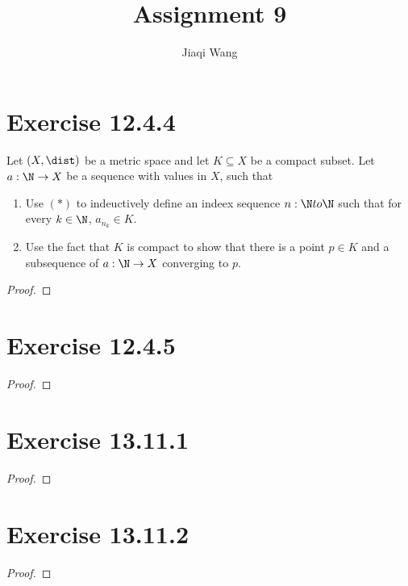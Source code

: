 \documentclass{assignment}
\title{Assignment 9}
\author{Jiaqi Wang}
\begin{document}
\maketitle

\section{Exercise 12.4.4}
\begin{problem}
    Let $(X, \dist)$ be a metric space and let $K \subseteq X$ be a compact subset. Let $a: \N \to X$ be a sequence with values in $X$, such that
    \begin{myCenter}[label=(*)]
    \end{myCenter}
    \begin{enumerate}
        \item Use $(*)$ to indeuctively define an indeex sequence $n: \N to \N$ such that for every $k \in \N$, $a_{n_k} \in K$.
        \item Use the fact that $K$ is compact to show that there is a point $p \in K$ and a subsequence of $a: \N \to X$ converging to $p$.
    \end{enumerate}
\end{problem}
\begin{proof}
\end{proof}

\section{Exercise 12.4.5}
\begin{problem}
\end{problem}
\begin{proof}
\end{proof}

\section{Exercise 13.11.1}
\begin{problem}
\end{problem}
\begin{proof}
\end{proof}

\section{Exercise 13.11.2}
\begin{problem}
\end{problem}
\begin{proof}
\end{proof}
\end{document}
